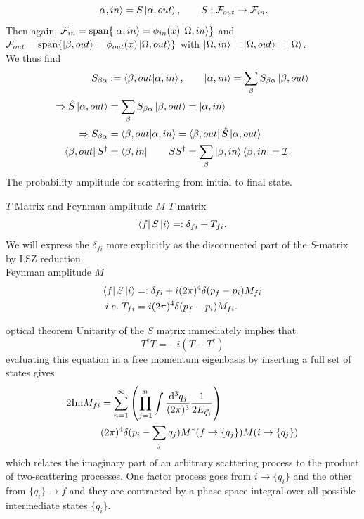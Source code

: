 \begin{equation}
	\ket{\alpha, in}=S\ket{\alpha,out}, \qquad S:\mathcal{F}_{out} \rightarrow \mathcal{F}_{in}.
	\end{equation}
Then again, $\mathcal{F}_{in}=\mathrm{span}\{\ket{\alpha,in} = \phi_{in}(x)\ket{\Omega,in}\}$ and $\mathcal{F}_{out}=\mathrm{span}\{\ket{\beta,out}= \phi_{out}(x) \ket{\Omega,out}\}$ with $\ket{\Omega,in} = \ket{\Omega,out}=\ket{\Omega}$.\\
We thus find
\begin{align}
	S_{\beta \alpha} &:= \braket{\beta,out}{\alpha,in}, \qquad \ket{\alpha,in} = \sum_{\beta} S_{\beta \alpha} \ket{\beta,out}\\
	\Rightarrow \hat{S}\ket{\alpha,out} &=\sum_{\beta} S_{\beta \alpha} \ket{\beta,out} = \ket{\alpha,in} \\
	\Rightarrow S_{\beta \alpha} &= \braket{\beta,out}{\alpha,in} = \bra{\beta,out} \hat{S}\ket{\alpha,out}\\
	\bra{\beta,out}S^{\dagger} &= \bra{\beta,in} \qquad SS^{\dagger}=\sum_{\beta} \ket{\beta,in}\bra{\beta,in} = \mathcal{I}.
\end{align}
The probability amplitude for scattering from initial to final state.
\begin{mybox}{$T$-Matrix and Feynman amplitude $M$}
	$T$-matrix
	\begin{equation}
		\label{eq:tmatrix}
		\bra{f}S\ket{i} =: \delta_{fi} + T_{fi}.
	\end{equation}
	We will express the $\delta_{fi}$ more explicitly as the disconnected part of the $S$-matrix by LSZ reduction.\\
	Feynman amplitude $M$
	\begin{align}
		\bra{f}S\ket{i} &=: \delta_{fi} + i (2\pi)^4 \delta(p_f-p_i)M_{fi} \\
		i.e.\; T_{fi} &= i (2\pi)^4 \delta(p_f-p_i) M_{fi}.
	\end{align}
\end{mybox}
\begin{mybox}{optical theorem}
	Unitarity of the $S$ matrix immediately implies that
	\begin{equation}
	\label{eq:tmatrixunitarity}
		T^\dagger T = - i(T-T^\dagger)
	\end{equation}
	evaluating this equation in a free momentum eigenbasis by inserting a full set of states gives
	\begin{align}
		2 \mathrm{Im}M_{fi} &=\sum_{n=1}^\infty \left(\prod_{j=1}^{n} \int \frac{\mathrm{d}^3 q_j}{(2 \pi)^3} \frac{1}{2 E_{\vec{q}_j}} \right)\\
		&(2 \pi)^4  \delta(p_i -\sum_j q_j) M^*(f\rightarrow \{q_j\} ) M(i\rightarrow\{q_j\}) \nonumber
	\end{align}
which relates the imaginary part of an arbitrary scattering process to the product of two-scattering processes. One factor process goes from $i\rightarrow \{q_i\}$ and the other from $\{q_i\} \rightarrow f$ and they are contracted by a phase space integral over all possible intermediate states $\{q_i\}$.
\end{mybox}
